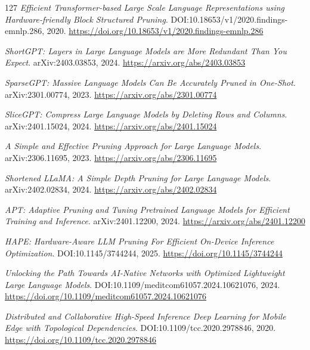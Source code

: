 \documentclass[11pt,a4paper]{article}
\begin{document}
\begin{thebibliography}{127}
\newblock \emph{Efficient Transformer-based Large Scale Language Representations using Hardware-friendly Block Structured Pruning}.
\newblock DOI:10.18653/v1/2020.findings-emnlp.286, 2020.
\newblock \url{https://doi.org/10.18653/v1/2020.findings-emnlp.286}

\newblock \emph{ShortGPT: Layers in Large Language Models are More Redundant Than You Expect}.
\newblock arXiv:2403.03853, 2024.
\newblock \url{https://arxiv.org/abs/2403.03853}

\newblock \emph{SparseGPT: Massive Language Models Can Be Accurately Pruned in One-Shot}.
\newblock arXiv:2301.00774, 2023.
\newblock \url{https://arxiv.org/abs/2301.00774}

\newblock \emph{SliceGPT: Compress Large Language Models by Deleting Rows and Columns}.
\newblock arXiv:2401.15024, 2024.
\newblock \url{https://arxiv.org/abs/2401.15024}

\newblock \emph{A Simple and Effective Pruning Approach for Large Language Models}.
\newblock arXiv:2306.11695, 2023.
\newblock \url{https://arxiv.org/abs/2306.11695}

\newblock \emph{Shortened LLaMA: A Simple Depth Pruning for Large Language Models}.
\newblock arXiv:2402.02834, 2024.
\newblock \url{https://arxiv.org/abs/2402.02834}

\newblock \emph{APT: Adaptive Pruning and Tuning Pretrained Language Models for Efficient Training and Inference}.
\newblock arXiv:2401.12200, 2024.
\newblock \url{https://arxiv.org/abs/2401.12200}

\newblock \emph{HAPE: Hardware-Aware LLM Pruning For Efficient On-Device Inference Optimization}.
\newblock DOI:10.1145/3744244, 2025.
\newblock \url{https://doi.org/10.1145/3744244}

\newblock \emph{Unlocking the Path Towards AI-Native Networks with Optimized Lightweight Large Language Models}.
\newblock DOI:10.1109/meditcom61057.2024.10621076, 2024.
\newblock \url{https://doi.org/10.1109/meditcom61057.2024.10621076}

\newblock \emph{Distributed and Collaborative High-Speed Inference Deep Learning for Mobile Edge with Topological Dependencies}.
\newblock DOI:10.1109/tcc.2020.2978846, 2020.
\newblock \url{https://doi.org/10.1109/tcc.2020.2978846}


\end{thebibliography}
\end{document}
